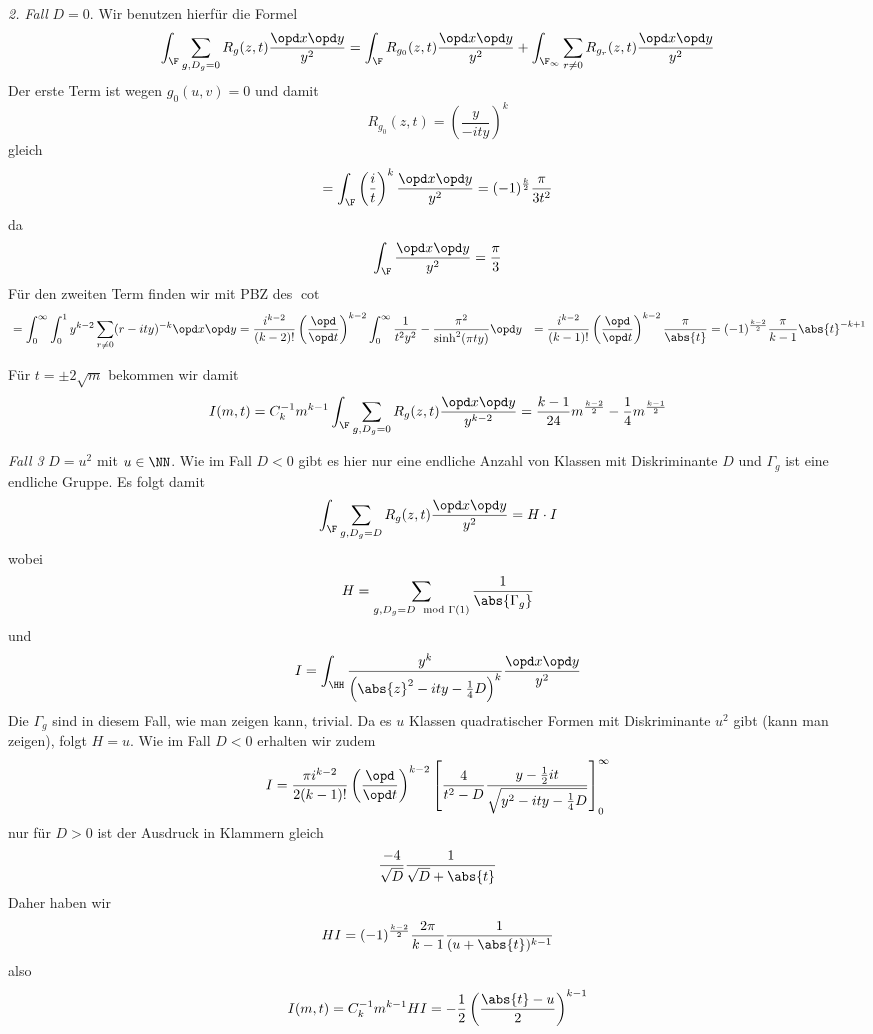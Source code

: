 \begin{bewe}
\emph{2. Fall} $D = 0$. Wir benutzen hierfür die Formel
\[
	\int_\F \sum_{g, D_g = 0} R_g(z,t) \frac{\opd x \opd y}{y^2} = \int_\F R_{g_0}(z,t) \frac{\opd x \opd y}{y^2} + \int_{\F_\infty} \sum_{r \neq 0} R_{g_r}(z,t) \frac{\opd x \opd y}{y^2}
\]
Der erste Term ist wegen $g_0(u,v) = 0$ und damit 
\[
	R_{g_0}(z,t) = \left( \frac y{-ity} \right)^k 
\]
gleich
\[
	= \int_\F \left( \frac it \right)^k \frac{\opd x \opd y}{y^2} = (-1)^{\frac k2} \frac \pi{3t^2}
\]
da 
\[
	\int_\F \frac{\opd x \opd y}{y^2} = \frac \pi 3
\]
Für den zweiten Term finden wir mit PBZ des $\cot$
\begin{align*}
	&= \int_0^\infty \int_0^1 y^{k-2} \sum_{r \neq 0} (r-ity)^{-k} \opd x \opd y = \frac{i^{k-2}}{(k-2)!} \left( \frac {\opd}{\opd t} \right)^{k-2} \int_0^\infty \frac 1{t^2y^2} - \frac {\pi^2}{\sinh^2(\pi ty)} \opd y
	&= \frac{i^{k-2}}{(k-1)!} \left( \frac {\opd}{\opd t} \right)^{k-2} \frac \pi {\abs{t}} = (-1)^{\frac {k-2}{2}} \frac{\pi}{k-1} \abs{t}^{-k+1}
\end{align*}

Für $t = \pm 2\sqrt m$ bekommen wir damit
\[
	I(m,t) = C_k^{-1} m^{k-1} \int_\F \sum_{g, D_g = 0} R_g(z,t) \frac {\opd x \opd y}{y^{k-2}} = \frac {k-1}{24} m^{\frac {k-2}2} - \frac 14 m^{\frac {k-1}2}
\]

\emph{Fall 3} $D = u^2$ mit $u \in \NN$. Wie im Fall $D < 0$ gibt es hier nur eine endliche Anzahl von Klassen mit Diskriminante $D$ und $\Gamma_g$ ist eine endliche Gruppe. Es folgt damit 
\[
	\int_\F \sum_{g, D_g = D} R_g(z,t) \frac {\opd x \opd y}{y^2} = H \cdot I
\]
wobei
\[
	H = \sum_{g, D_g = D \mod \Gamma(1)} \frac 1{\abs{\Gamma_g}}
\]
und
\[
	I = \int_\HH \frac {y^k}{\left( \abs{z}^2 - ity - \frac 14 D \right)^k} \frac {\opd x \opd y}{y^2}
\]
Die $\Gamma_g$ sind in diesem Fall, wie man zeigen kann, trivial. Da es $u$ Klassen quadratischer Formen mit Diskriminante $u^2$ gibt (kann man zeigen), folgt $H = u$. Wie im Fall $D < 0$ erhalten wir zudem
\[
	I = \frac{\pi i^{k-2}}{2(k-1)!} \left( \frac {\opd}{\opd t} \right)^{k-2} \left[ \frac{4}{t^2 - D} \frac{y - \frac 12 it}{\sqrt{y^2 - ity - \frac 14 D}} \right]_0^\infty
\]
nur für $D > 0$ ist der Ausdruck in Klammern gleich 
\[
	\frac {-4}{\sqrt{D}} \frac 1{\sqrt{D} + \abs{t}}
\]
Daher haben wir
\[
	HI = (-1)^{\frac {k-2}2} \frac{2\pi}{k-1} \frac 1{(u + \abs{t})^{k-1}}
\]
also
\[
	I(m,t) = C_k^{-1} m^{k-1} HI = - \frac 12 \left( \frac{\abs{t} - u}2 \right)^{k-1}
\]


\end{bewe}












